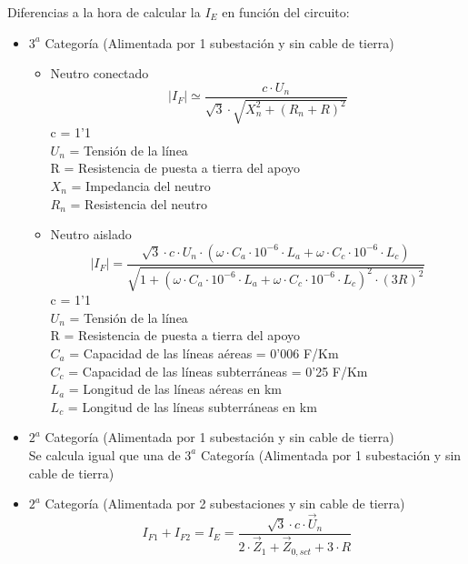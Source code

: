 \documentclass[10pt,a4paper]{article}
\begin{document}
Diferencias a la hora de calcular la $I_E$ en función del circuito:
\begin{itemize}
    \item $3^a$ Categoría (Alimentada por 1 subestación y sin cable de tierra)
            \begin{itemize}
                \item Neutro conectado
                $$
                \left|I_{F}\right| \simeq \frac{c \cdot U_{n}}{\sqrt{3} \cdot \sqrt{X_{n}^{2}+\left(R_{n}+R\right)^{2}}}
                $$
                c = 1'1 \\
                $U_n$ = Tensión de la línea \\
                R = Resistencia de puesta a tierra del apoyo \\
                $X_n$ = Impedancia del neutro \\
                $R_n$ = Resistencia del neutro
                
                \item Neutro aislado
                $$
                \left|I_{F}\right|=\frac{\sqrt{3} \cdot c \cdot U_{n} \cdot\left(\omega \cdot C_{a}\cdot 10^{-6} \cdot L_{a}+\omega \cdot C_{c}\cdot 10^{-6} \cdot L_{c}\right)}{\sqrt{1+\left(\omega \cdot C_{a}\cdot 10^{-6} \cdot L_{a}+\omega \cdot C_{c}\cdot 10^{-6} \cdot L_{c}\right)^{2} \cdot(3 R)^{2}}}
                $$
                c = 1'1 \\
                $U_n$ = Tensión de la línea \\
                R = Resistencia de puesta a tierra del apoyo \\
                $C_a$ = Capacidad de las líneas aéreas = 0'006 \mu F/Km \\
                $C_c$ = Capacidad de las líneas subterráneas = 0'25 \mu  F/Km \\
                $L_a$ = Longitud de las líneas aéreas en km \\
                $L_c$ = Longitud de las líneas subterráneas en km
            \end{itemize}   
    
    \item $2^a$ Categoría (Alimentada por 1 subestación y sin cable de tierra)
        \\
        
        Se calcula igual que una de $3^a$ Categoría (Alimentada por 1 subestación y sin cable de tierra)
        
    \newpage
    \item $2^a$ Categoría (Alimentada por 2 subestaciones y sin cable de tierra)
    $$
    I_{F1}+I_{F2} = I_E =\frac{\sqrt{3} \cdot c \cdot \vec{U}_{n}}{2 \cdot \vec{Z}_{1}+\vec{Z}_{0, s c t}+3 \cdot R}
    $$
    

\end{itemize}
\end{document}
